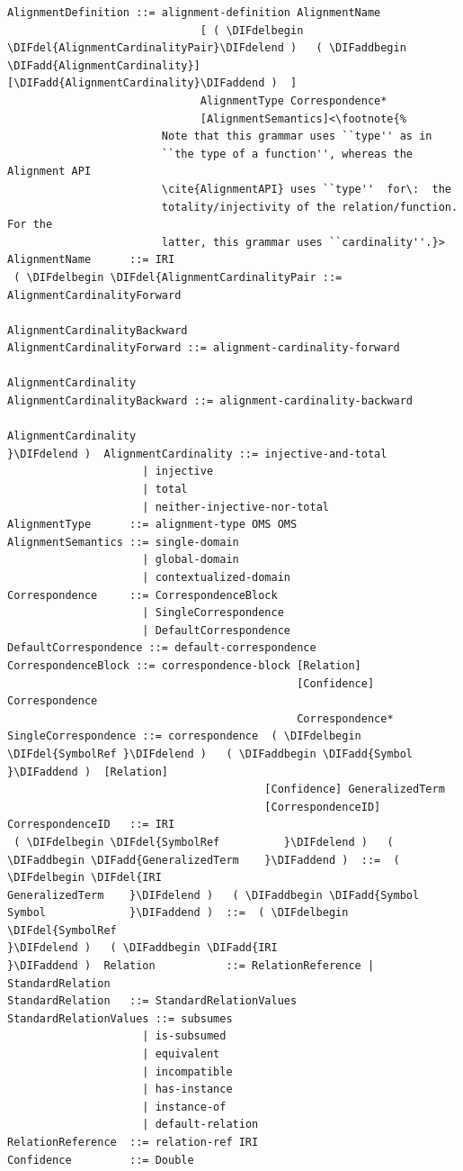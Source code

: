 \documentclass[10pt,fleqn,final]{scrreprt}
\newenvironment{definitions}[0]{\medskip }{}
\providecommand{\DIFadd}[1]{{\protect\color{blue}\uwave{#1}}} %
\providecommand{\DIFdel}[1]{{\protect\color{red}\sout{#1}}}                      %
\providecommand{\DIFaddbegin}{} %
\providecommand{\DIFaddend}{} %
\providecommand{\DIFdelbegin}{} %
\providecommand{\DIFdelend}{} %
\begin{document}
\begin{definitions}
\begin{lstlisting}[language=ebnf,escapeinside={()},mathescape]  %DIF >  abstract syntax
AlignmentDefinition ::= alignment-definition AlignmentName
                              [ ( \DIFdelbegin \DIFdel{AlignmentCardinalityPair}\DIFdelend )   ( \DIFaddbegin \DIFadd{AlignmentCardinality}] [\DIFadd{AlignmentCardinality}\DIFaddend )  ]
                              AlignmentType Correspondence*
                              [AlignmentSemantics]<\footnote{%
                        Note that this grammar uses ``type'' as in
                        ``the type of a function'', whereas the Alignment API
                        \cite{AlignmentAPI} uses ``type''  for\:  the
                        totality/injectivity of the relation/function.  For the
                        latter, this grammar uses ``cardinality''.}>
AlignmentName      ::= IRI
 ( \DIFdelbegin \DIFdel{AlignmentCardinalityPair ::= AlignmentCardinalityForward
                                                         AlignmentCardinalityBackward
AlignmentCardinalityForward ::= alignment-cardinality-forward
                                                              AlignmentCardinality
AlignmentCardinalityBackward ::= alignment-cardinality-backward
                                                                AlignmentCardinality
}\DIFdelend )  AlignmentCardinality ::= injective-and-total
                     | injective
                     | total
                     | neither-injective-nor-total
AlignmentType      ::= alignment-type OMS OMS
AlignmentSemantics ::= single-domain
                     | global-domain
                     | contextualized-domain
Correspondence     ::= CorrespondenceBlock
                     | SingleCorrespondence
                     | DefaultCorrespondence
DefaultCorrespondence ::= default-correspondence
CorrespondenceBlock ::= correspondence-block [Relation]
                                             [Confidence] Correspondence
                                             Correspondence*
SingleCorrespondence ::= correspondence  ( \DIFdelbegin \DIFdel{SymbolRef }\DIFdelend )   ( \DIFaddbegin \DIFadd{Symbol }\DIFaddend )  [Relation]
                                        [Confidence] GeneralizedTerm
                                        [CorrespondenceID]
CorrespondenceID   ::= IRI
 ( \DIFdelbegin \DIFdel{SymbolRef          }\DIFdelend )   ( \DIFaddbegin \DIFadd{GeneralizedTerm    }\DIFaddend )  ::=  ( \DIFdelbegin \DIFdel{IRI
GeneralizedTerm    }\DIFdelend )   ( \DIFaddbegin \DIFadd{Symbol
Symbol             }\DIFaddend )  ::=  ( \DIFdelbegin \DIFdel{SymbolRef
}\DIFdelend )   ( \DIFaddbegin \DIFadd{IRI
}\DIFaddend )  Relation           ::= RelationReference | StandardRelation
StandardRelation   ::= StandardRelationValues
StandardRelationValues ::= subsumes
                     | is-subsumed
                     | equivalent
                     | incompatible
                     | has-instance
                     | instance-of
                     | default-relation
RelationReference  ::= relation-ref IRI
Confidence         ::= Double
\end{lstlisting}


\end{definitions}
\end{document}
